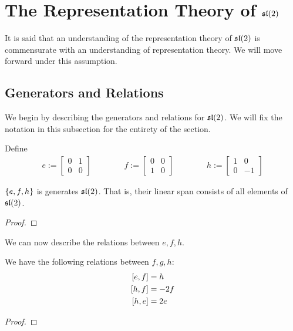 \section{The Representation Theory of $\sl{2}$}\label{Ch2:Sec:sl2}

It is said that an understanding of the representation theory of $\sl{2}$ is commensurate with an understanding of representation theory. We will move forward under this assumption.

\subsection{Generators and Relations}

We begin by describing the generators and relations for $\sl{2}$. We will fix the notation in this subsection for the entirety of the section.

Define
\begin{align}
    e :=
    \begin{bmatrix}
        0 & 1 \\ 0 & 0
    \end{bmatrix}
    \qquad\qquad
    f :=
    \begin{bmatrix}
        0 & 0 \\ 1 & 0
    \end{bmatrix}
    \qquad\qquad
    h :=
    \begin{bmatrix}
        1 & 0 \\ 0 & -1
    \end{bmatrix}
\end{align}

\begin{boxproposition}[Generators of $\sl{2}$]
    $\left\{ e, f, h \right\}$ is generates $\sl{2}$. That is, their linear span consists of all elements of $\sl{2}$.
\end{boxproposition}
\begin{proof}
    \sorry
\end{proof}

We can now describe the relations between $e, f, h$.

\begin{boxproposition}
    We have the following relations between $f, g, h$:
    \begin{align}
        \left[ e, f \right] &= h \\
        \left[ h, f \right] &= -2f \\
        \left[ h, e \right] &= 2e
    \end{align}
\end{boxproposition}
\begin{proof}
    \sorry
\end{proof}

